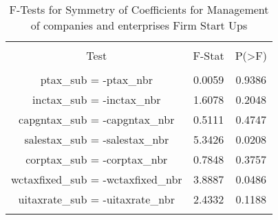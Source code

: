 
\begin{table}[!htbp] \centering 
  \caption{F-Tests for Symmetry of Coefficients for Management of companies and enterprises Firm Start Ups} 
  \label{55Ftests} 
\begin{tabular}{@{\extracolsep{5pt}} ccc} 
\\[-1.8ex]\hline 
\hline \\[-1.8ex] 
Test & F-Stat & P(\textgreater F) \\ 
\hline \\[-1.8ex] 
ptax\_sub = -ptax\_nbr & 0.0059 & 0.9386 \\ 
inctax\_sub = -inctax\_nbr & 1.6078 & 0.2048 \\ 
capgntax\_sub = -capgntax\_nbr & 0.5111 & 0.4747 \\ 
salestax\_sub = -salestax\_nbr & 5.3426 & 0.0208 \\ 
corptax\_sub = -corptax\_nbr & 0.7848 & 0.3757 \\ 
wctaxfixed\_sub = -wctaxfixed\_nbr & 3.8887 & 0.0486 \\ 
uitaxrate\_sub = -uitaxrate\_nbr & 2.4332 & 0.1188 \\ 
\hline \\[-1.8ex] 
\end{tabular} 
\end{table} 
